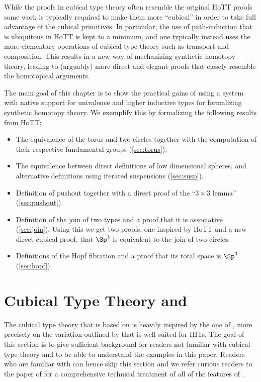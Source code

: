 While the proofs in cubical type theory often resemble the original
HoTT proofs some work is typically required to make them more
``cubical'' in order to take full advantage of the cubical
primitives. In particular, the use of path-induction that is
ubiquitous in HoTT is kept to a minimum, and one typically instead
uses the more elementary operations of cubical type theory such as
transport and composition. This results in a new way of mechanizing
synthetic homotopy theory, leading to (arguably) more direct and
elegant proofs that closely resemble the homotopical arguments.

The main goal of this chapter is to show the practical gains of using a
system with native support for univalence and higher inductive types
for formalizing synthetic homotopy theory. We exemplify this by
formalizing the following results from HoTT:
%
\begin{itemize}
\item The equivalence of the torus and two circles together with the
  computation of their respective fundamental groups
  (\cref{sec:torus}).
\item The equivalence between direct definitions of low dimensional
  spheres, and alternative definitions using iterated suspensions
  (\cref{sec:susp}).
\item Definition of pushout together with a direct proof of the ``$3
  \times 3$ lemma'' (\cref{sec:pushout}).
\item Definition of the join of two types and a proof that it is
  associative (\cref{sec:join}). Using this we get two proofs, one
  inspired by HoTT and a new direct cubical proof, that $\Sp^3$ is
  equivalent to the join of two circles.
\item Definitions of the Hopf fibration and a proof that its total
  space is $\Sp^3$ (\cref{sec:hopf}).
\end{itemize}

\section{Cubical Type Theory and \CubicalAgda}
\label{sec:cubical-agda}

The cubical type theory that \CubicalAgda is based on is
heavily inspired by the one of , more precisely on the
variation outlined by  that is well-suited for HITs. The
goal of this section is to give sufficient background for readers not
familiar with cubical type theory and \CubicalAgda to be able
to understand the examples in this paper. Readers who are familiar
with \CubicalAgda can hence skip this section and we refer
curious readers to the paper of  for a
comprehensive technical treatment of all of the features of
\CubicalAgda.

